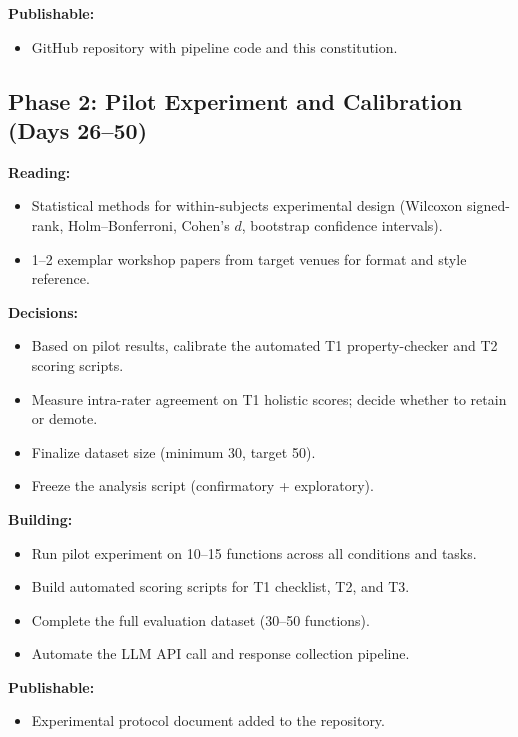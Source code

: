 \documentclass[11pt]{article}
\begin{document}
\textbf{Publishable:}
\begin{itemize}
  \item GitHub repository with pipeline code and this constitution.
\end{itemize}

\subsection*{Phase 2: Pilot Experiment and Calibration (Days 26--50)}

\textbf{Reading:}
\begin{itemize}
  \item Statistical methods for within-subjects experimental design
        (Wilcoxon signed-rank, Holm--Bonferroni, Cohen's $d$, bootstrap
        confidence intervals).
  \item 1--2 exemplar workshop papers from target venues for format
        and style reference.
\end{itemize}

\textbf{Decisions:}
\begin{itemize}
  \item Based on pilot results, calibrate the automated T1
        property-checker and T2 scoring scripts.
  \item Measure intra-rater agreement on T1 holistic scores; decide
        whether to retain or demote.
  \item Finalize dataset size (minimum 30, target 50).
  \item Freeze the analysis script (confirmatory + exploratory).
\end{itemize}

\textbf{Building:}
\begin{itemize}
  \item Run pilot experiment on 10--15 functions across all conditions
        and tasks.
  \item Build automated scoring scripts for T1 checklist, T2, and T3.
  \item Complete the full evaluation dataset (30--50 functions).
  \item Automate the LLM API call and response collection pipeline.
\end{itemize}

\textbf{Publishable:}
\begin{itemize}
  \item Experimental protocol document added to the repository.
\end{itemize}
\end{document}

